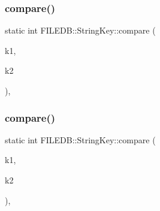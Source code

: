 \subsubsection{\texorpdfstring{compare()}{compare()}\hspace{0.1cm}{\footnotesize\ttfamily [2/3]}}
{\footnotesize\ttfamily static int F\+I\+L\+E\+D\+B\+::\+String\+Key\+::compare (\begin{DoxyParamCaption}\item[{const \mbox{\hyperlink{adat-devel_2other__libs_2filedb_2filehash_2ffdb__db_8h_aa2e0984399491df0fdd20898ca8758f9}{F\+F\+D\+B\+\_\+\+D\+BT}} $\ast$}]{k1,  }\item[{const \mbox{\hyperlink{adat-devel_2other__libs_2filedb_2filehash_2ffdb__db_8h_aa2e0984399491df0fdd20898ca8758f9}{F\+F\+D\+B\+\_\+\+D\+BT}} $\ast$}]{k2 }\end{DoxyParamCaption})\hspace{0.3cm}{\ttfamily [inline]}, {\ttfamily [static]}}

\mbox{\label{classFILEDB_1_1StringKey_a22a3b33f93050dffa239cfc106044935}} 
\subsubsection{\texorpdfstring{compare()}{compare()}\hspace{0.1cm}{\footnotesize\ttfamily [3/3]}}
{\footnotesize\ttfamily static int F\+I\+L\+E\+D\+B\+::\+String\+Key\+::compare (\begin{DoxyParamCaption}\item[{const \mbox{\hyperlink{adat-devel_2other__libs_2filedb_2filehash_2ffdb__db_8h_aa2e0984399491df0fdd20898ca8758f9}{F\+F\+D\+B\+\_\+\+D\+BT}} $\ast$}]{k1,  }\item[{const \mbox{\hyperlink{adat-devel_2other__libs_2filedb_2filehash_2ffdb__db_8h_aa2e0984399491df0fdd20898ca8758f9}{F\+F\+D\+B\+\_\+\+D\+BT}} $\ast$}]{k2 }\end{DoxyParamCaption})\hspace{0.3cm}{\ttfamily [inline]}, {\ttfamily [static]}}

\mbox{\label{classFILEDB_1_1StringKey_a430c4d6d22db7160c501c1703f9f13cf}} 
